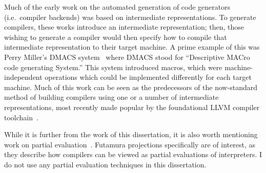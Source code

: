 %

Much of the early work on
  the automated generation of code generators
  (i.e.~compiler backends)
  was based on intermediate representations.
To generate compilers,
  these works introduce an intermediate
  representation;
  then, those wishing to generate a compiler
  would then specify how to compile
  that intermediate representation
  to their target machine.
A prime example of this 
  was Perry Miller's DMACS system~\cite{miller1971automatic}
  where DMACS stood for
  ``Descriptive MACro code generating System.''
This
  system introduced
  macros, which were 
  machine-independent
  operations
  which could be implemented
  differently
  for each target machine.
Much of this work can be seen
  as the predecessors
  of the 
  now-standard method of building compilers
  using one or a number of
  intermediate representations,
  most recently made popular
  by the
  foundational LLVM compiler 
  toolchain~\cite{lattner2004llvm}.

While it is further
  from the work of this dissertation,
  it is also worth mentioning work on
  partial evaluation~\cite{consel1993tutorial,futamura1999partial}.
Futamura projections
  specifically
  are of interest,
  as they describe how compilers can
  be viewed as partial evaluations
  of interpreters.
I do not use any partial evaluation techniques
  in this dissertation.

